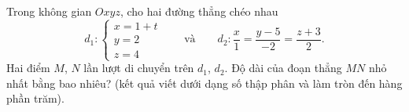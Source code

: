 \begin{ex}
Trong không gian $Oxyz$, cho hai đường thẳng chéo nhau
\[d_1\colon\begin{cases}x=1+t\\y=2\\z=4\end{cases}\qquad\text{và}\qquad d_2\colon\dfrac x1=\dfrac{y-5}{-2}=\dfrac{z+3}{2}.\]
Hai điểm $M$, $N$ lần lượt di chuyển trên $d_1$, $d_2$. Độ dài của đoạn thẳng $MN$ nhỏ nhất bằng bao nhiêu? (kết quả viết dưới dạng số thập phân và làm tròn đến hàng phần trăm).
\end{ex}
